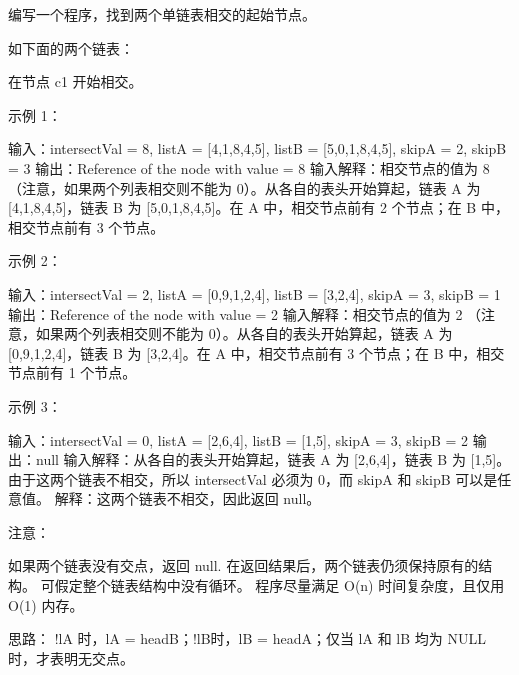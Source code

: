 编写一个程序，找到两个单链表相交的起始节点。

如下面的两个链表：

在节点 c1 开始相交。

 

示例 1：

输入：intersectVal = 8, listA = [4,1,8,4,5], listB = [5,0,1,8,4,5], skipA = 2, skipB = 3
输出：Reference of the node with value = 8
输入解释：相交节点的值为 8 （注意，如果两个列表相交则不能为 0）。从各自的表头开始算起，链表 A 为 [4,1,8,4,5]，链表 B 为 [5,0,1,8,4,5]。在 A 中，相交节点前有 2 个节点；在 B 中，相交节点前有 3 个节点。

 

示例 2：

输入：intersectVal = 2, listA = [0,9,1,2,4], listB = [3,2,4], skipA = 3, skipB = 1
输出：Reference of the node with value = 2
输入解释：相交节点的值为 2 （注意，如果两个列表相交则不能为 0）。从各自的表头开始算起，链表 A 为 [0,9,1,2,4]，链表 B 为 [3,2,4]。在 A 中，相交节点前有 3 个节点；在 B 中，相交节点前有 1 个节点。

 

示例 3：

输入：intersectVal = 0, listA = [2,6,4], listB = [1,5], skipA = 3, skipB = 2
输出：null
输入解释：从各自的表头开始算起，链表 A 为 [2,6,4]，链表 B 为 [1,5]。由于这两个链表不相交，所以 intersectVal 必须为 0，而 skipA 和 skipB 可以是任意值。
解释：这两个链表不相交，因此返回 null。

 

注意：

    如果两个链表没有交点，返回 null.
    在返回结果后，两个链表仍须保持原有的结构。
    可假定整个链表结构中没有循环。
    程序尽量满足 O(n) 时间复杂度，且仅用 O(1) 内存。





























思路：
!lA 时，lA = headB；!lB时，lB = headA；仅当 lA 和 lB 均为 NULL 时，才表明无交点。




























